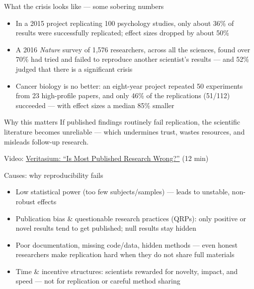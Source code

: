 \documentclass[aspectratio=169]{beamer}
\begin{document}
\begin{frame}{What the crisis looks like — some sobering numbers}
\begin{itemize}
\item In a 2015 project replicating 100 psychology studies, only about 36\% of results were successfully replicated; effect sizes dropped by about 50\% \citep{open2015reproducibility}

  \item A 2016 \textit{Nature} survey of 1,576 researchers, across all the sciences, found over 70\% had tried and failed to reproduce another scientist's results — and 52\% judged that there is a significant crisis \citep{baker2016crisis}
  \item Cancer biology is no better: an eight-year project repeated 50 experiments from 23 high-profile papers, and only 46\% of the replications (51/112) succeeded --- with effect sizes a median 85\% smaller \citep{errington2021cancer}
\end{itemize}
\begin{block}{Why this matters}
If published findings routinely fail replication, the scientific literature becomes unreliable — which undermines trust, wastes resources, and misleads follow-up research.
\end{block}

\medskip
\small Video: \href{https://www.youtube.com/watch?v=42QuXLucH3Q}{Veritasium: ``Is Most Published Research Wrong?''} (12 min) %
\end{frame}

\begin{frame}{Causes: why reproducibility fails}
\begin{itemize}
\item Low statistical power (too few subjects/samples) — leads to unstable, non-robust effects
   \citep{ioannidis2005false}
  \item Publication bias \& questionable research practices (QRPs): only positive or novel results tend to get published; null results stay hidden
  \item Poor documentation, missing code/data, hidden methods — even honest researchers make replication hard when they do not share full materials
  \item Time \& incentive structures: scientists rewarded for novelty, impact, and speed — not for replication or careful method sharing
\end{itemize}
\end{frame}
\end{document}
